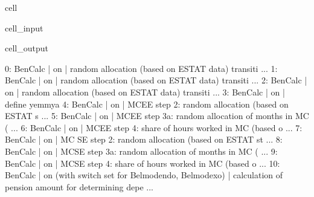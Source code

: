 \documentclass[letterpaper,10pt,english]{sphinxmanual}
\begin{document}
\begin{sphinxuseclass}{cell}
\begin{sphinxuseclass}{cell_input}
\begin{sphinxVerbatim}[commandchars=\\\{\}]
\PYG{p}{[}\PYG{p}{]}\PYG{p}{[}\PYG{p}{]} 
\end{sphinxVerbatim}

\end{sphinxuseclass}
\begin{sphinxuseclass}{cell_output}
\begin{sphinxVerbatim}[commandchars=\\\{\}]
0: BenCalc       | on                                                       |    random allocation (based on ESTAT data) \PYGZhy{} transiti ... 
1: BenCalc       | on                                                       |    random allocation (based on ESTAT data) \PYGZhy{} transiti ... 
2: BenCalc       | on                                                       |    random allocation (based on ESTAT data) \PYGZhy{} transiti ... 
3: BenCalc       | on                                                       |    define yemmy\PYGZus{}a  
4: BenCalc       | on                                                       |    MC\PYGZus{}EE  step 2: random allocation (based on ESTAT s ... 
5: BenCalc       | on                                                       |    MC\PYGZus{}EE step 3a: random allocation of months in MC ( ... 
6: BenCalc       | on                                                       |    MC\PYGZus{}EE step 4: share of hours worked in MC (based o ... 
7: BenCalc       | on                                                       |    MC SE step 2: random allocation (based on ESTAT st ... 
8: BenCalc       | on                                                       |    MC\PYGZus{}SE step 3a: random allocation of months in MC ( ... 
9: BenCalc       | on                                                       |    MC\PYGZus{}SE step 4: share of hours worked in MC (based o ... 
10: BenCalc      | on (with switch set for Belmod\PYGZus{}endo, Belmod\PYGZus{}exo)         |    calculation of pension amount for determining depe ... 

\end{sphinxVerbatim}
\end{sphinxuseclass}
\end{sphinxuseclass}
\end{document}
